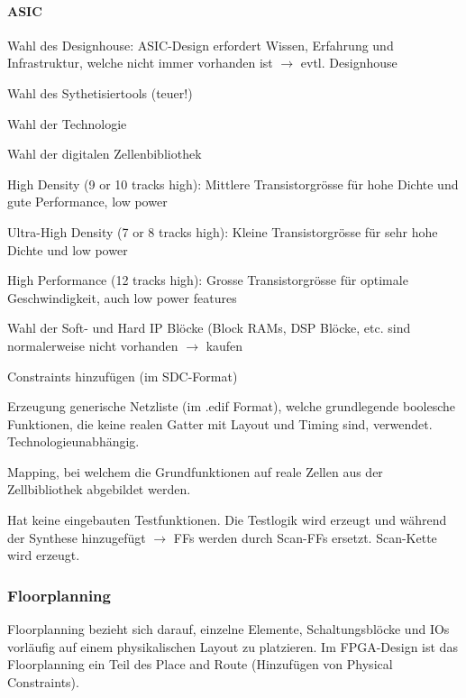 \paragraph{ASIC}
\begin{compactitem}
    \item Wahl des Designhouse: ASIC-Design erfordert Wissen, Erfahrung und Infrastruktur, welche nicht immer vorhanden ist $\rightarrow$ evtl. Designhouse
    \item Wahl des Sythetisiertools (teuer!)
    \item Wahl der Technologie
    \item Wahl der digitalen Zellenbibliothek
    \begin{compactitem}
        \item High Density (9 or 10 tracks high): Mittlere Transistorgrösse für hohe Dichte und gute Performance, low power
        \item Ultra-High Density (7 or 8 tracks high): Kleine Transistorgrösse für sehr hohe Dichte und low power
        \item High Performance (12 tracks high): Grosse Transistorgrösse für optimale Geschwindigkeit, auch low power features
    \end{compactitem}
    \item Wahl der Soft- und Hard IP Blöcke (Block RAMs, DSP Blöcke, etc. sind normalerweise nicht vorhanden $\rightarrow$ kaufen
    \item Constraints hinzufügen (im SDC-Format) 
    \item Erzeugung generische Netzliste (im .edif Format), welche grundlegende boolesche Funktionen, die keine realen Gatter mit Layout und Timing sind, verwendet. Technologieunabhängig.
    \item Mapping, bei welchem die Grundfunktionen auf reale Zellen aus der Zellbibliothek abgebildet werden.
    \item Hat keine eingebauten Testfunktionen. Die Testlogik wird erzeugt und während der Synthese hinzugefügt $\rightarrow$ FFs werden durch Scan-FFs ersetzt. Scan-Kette wird erzeugt.
\end{compactitem}

\subsubsection{Floorplanning}
Floorplanning bezieht sich darauf, einzelne Elemente, Schaltungsblöcke und IOs vorläufig auf einem physikalischen Layout zu platzieren. Im FPGA-Design ist das Floorplanning ein Teil des Place and Route (Hinzufügen von Physical Constraints).

